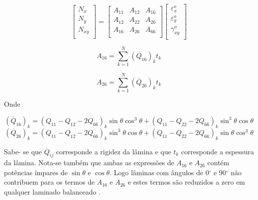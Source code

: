 \begin{equation} \label{eq_loadingA}
\begin{bmatrix}
    N_{x} \\
    N_{y} \\
    N_{xy} \\
\end{bmatrix}
=
\begin{bmatrix}
    A_{11} & A_{12} & A_{16}\\
    A_{12} & A_{22} & A_{26}\\
    A_{16} & A_{26} & A_{66}\\
\end{bmatrix}
\begin{bmatrix}
    \varepsilon_{x}^o \\
    \varepsilon_{y}^o \\
    \gamma_{xy}^o \\
\end{bmatrix}
\end{equation}

\begin{equation} \label{eq_A16}
A_{16}
=
\sum_{k=1}^N (\overline{Q}_{16})_k t_k
\end{equation}

\begin{equation} \label{eq_A26}
A_{26}
=
\sum_{k=1}^N (\overline{Q}_{26})_k t_k
\end{equation}

Onde

\begin{equation} \label{eq_Q16}
(\overline{Q}_{16})_k
=
({Q}_{11}-{Q}_{12}-2{Q}_{66})_k \sin\theta \cos^3\theta + ({Q}_{11}-{Q}_{22}-2{Q}_{66})_k \sin^3\theta \cos\theta
\end{equation}
\begin{equation} \label{eq_Q26}
(\overline{Q}_{26})_k
=
({Q}_{11}-{Q}_{12}-2{Q}_{66})_k \sin^3\theta \cos\theta + ({Q}_{11}-{Q}_{22}-2{Q}_{66})_k \sin\theta \cos^3\theta
\end{equation}

Sabe- se que $ \overline{Q}_{ij} $ corresponde a rigidez da lâmina e que $ t_k $ corresponde a espessura da lâmina. Nota-se também que ambas as expressões de $ A_{16} $ e $ A_{26} $ contém potências ímpares de $ \sin\theta $ e $ \cos\theta $. Logo lâminas com ângulos de 0$^{\circ}$ e 90$^{\circ}$ não contribuem para os termos de $ A_{16} $ e $ A_{26} $ e estes termos são reduzidos a zero em qualquer laminado balanceado \cite{nasa1997guidelines}.

